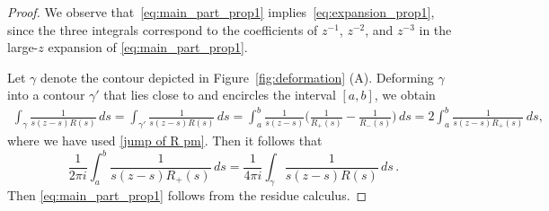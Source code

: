 \documentclass{amsart}
\theoremstyle{plain}
\theoremstyle{remark}
\numberwithin{equation}{section}
\begin{document}
\begin{proof}
We observe that~\eqref{eq:main_part_prop1} implies~\eqref{eq:expansion_prop1}, since the three integrals correspond to the coefficients of $z^{-1}$, $z^{-2}$, and $z^{-3}$ in the large-$z$ expansion of \eqref{eq:main_part_prop1}. 

Let $\gamma$ denote the contour depicted in Figure~\ref{fig:deformation} (A). Deforming $\gamma$ into a contour $\gamma'$ that lies close to and encircles the interval $[a,b]$, we obtain
\begin{align*}
\int_\gamma \frac{1}{s(z-s)R(s)} \, ds = \int_{\gamma'}
\frac{1}{s(z-s)R(s)} \, ds = \int_{ a }^b \frac{1}{s(z-s)} \Big( \frac{1}{R_+(s)}-\frac{1}{R_-(s)}\Big) \,ds  = 2\int_a^b \frac{1}{s(z-s)R_+(s)} \, ds, 
\end{align*}
where we have used \eqref{jump of R pm}. 
Then it follows that 
\begin{equation}
    \frac{1}{2\pi i}\int_a^b \frac{1}{s(z-s)R_+(s)} \, ds = \frac{1}{4\pi i}\int_\gamma \frac{1}{s(z-s)R(s)} \, ds\,.
\end{equation}
Then \eqref{eq:main_part_prop1} follows from the residue calculus. 
\end{proof}
\end{document}
